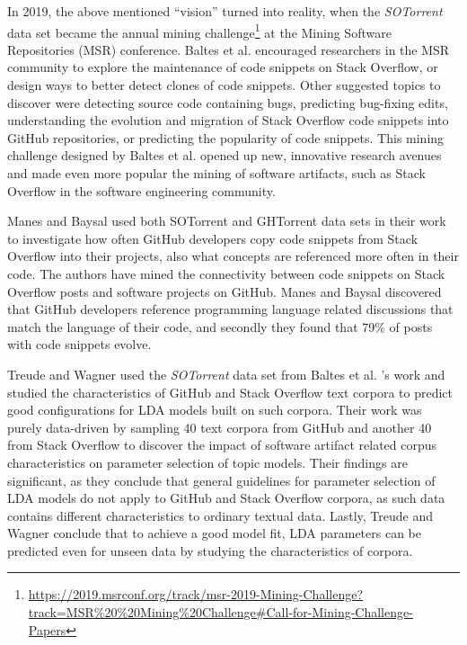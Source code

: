         In 2019, the above mentioned ``vision'' turned into reality, when the \emph{SOTorrent} data set became the annual mining challenge\footnote{\url{https://2019.msrconf.org/track/msr-2019-Mining-Challenge?track=MSR\%20\%20Mining\%20Challenge\#Call-for-Mining-Challenge-Papers}} at the Mining Software Repositories (MSR) conference. Baltes et al. \cite{baltes2019sotorrent} encouraged researchers in the MSR community to explore the maintenance of code snippets on Stack Overflow, or design ways to better detect clones of code snippets. Other suggested topics to discover were detecting source code containing bugs, predicting bug-fixing edits, understanding the evolution and migration of Stack Overflow code snippets into GitHub repositories, or predicting the popularity of code snippets. This mining challenge designed by Baltes et al. \cite{baltes2019sotorrent} opened up new, innovative research avenues and made even more popular the mining of software artifacts, such as Stack Overflow in the software engineering community. 
        
        Manes and Baysal \cite{manes2019often} used both SOTorrent \cite{baltes2019sotorrent} and GHTorrent \cite{gousios2013ghtorent} data sets in their work to investigate how often GitHub developers copy code snippets from Stack Overflow into their projects, also what concepts are referenced more often in their code. The authors have mined the connectivity between code snippets on Stack Overflow posts and software projects on GitHub. Manes and Baysal \cite{manes2019often} discovered that GitHub developers reference programming language related discussions that match the language of their code, and secondly they found that 79\% of posts with code snippets evolve.
        
        Treude and Wagner \cite{treude2019predicting} used the \emph{SOTorrent} data set from Baltes et al. \cite{baltes2019sotorrent}'s work and studied the characteristics of GitHub and Stack Overflow text corpora to predict good configurations for LDA models built on such corpora. Their work was purely data-driven by sampling 40 text corpora from GitHub and another 40 from Stack Overflow to discover the impact of software artifact related corpus characteristics on parameter selection of topic models. Their findings are significant, as they conclude that general guidelines for parameter selection of LDA models do not apply to GitHub and Stack Overflow corpora, as such data contains different characteristics to ordinary textual data. Lastly, Treude and Wagner conclude that to achieve a good model fit, LDA parameters can be predicted even for unseen data by studying the characteristics of corpora.
        
